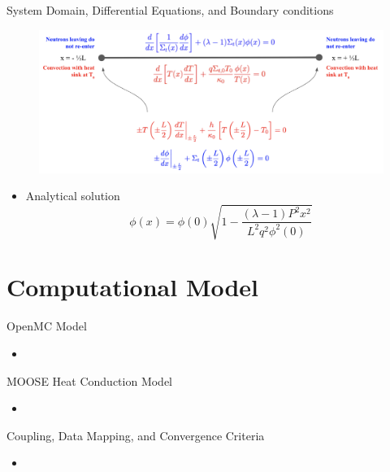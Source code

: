 \documentclass[9pt,t]{beamer}
\begin{document}
\begin{frame}{System Domain, Differential Equations, and Boundary conditions}
    \begin{figure}[H]
        \centering
        \includegraphics[width=0.95\linewidth]{figures/1D_Benchmark_Diagram.png}
    \end{figure}
    \begin{itemize}
        \item Analytical solution
        \begin{equation}
            \phi(x) = \phi(0) \sqrt{1 - \frac{(\lambda - 1)P^{2}x^{2}}{L^{2}q^{2}\phi^2(0)}}
        \end{equation}
    \end{itemize}
\end{frame}
\section{Computational Model}
\begin{frame}{OpenMC Model}
    \begin{itemize}
        \item
    \end{itemize}
\end{frame}

\begin{frame}{MOOSE Heat Conduction Model}
    \begin{itemize}
        \item
    \end{itemize}
\end{frame}

\begin{frame}{Coupling, Data Mapping, and Convergence Criteria}
    \begin{itemize}
        \item
    \end{itemize}
\end{frame}
\end{document}

